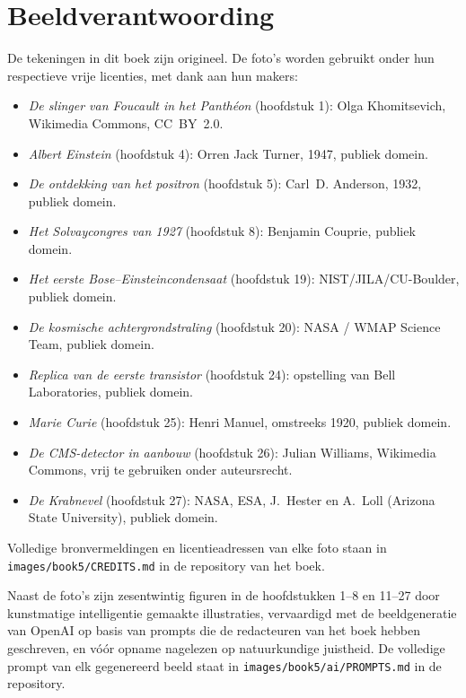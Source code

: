 \chapter*{Beeldverantwoording}

De tekeningen in dit boek zijn origineel. De foto's worden gebruikt
onder hun respectieve vrije licenties, met dank aan hun makers:

\begin{itemize}
  \item \emph{De slinger van Foucault in het Panthéon}
        (hoofdstuk 1): Olga Khomitsevich, Wikimedia Commons,
        CC~BY~2.0.
  \item \emph{Albert Einstein} (hoofdstuk 4): Orren Jack Turner,
        1947, publiek domein.
  \item \emph{De ontdekking van het positron} (hoofdstuk 5):
        Carl~D. Anderson, 1932, publiek domein.
  \item \emph{Het Solvaycongres van 1927} (hoofdstuk 8): Benjamin
        Couprie, publiek domein.
  \item \emph{Het eerste Bose--Einsteincondensaat} (hoofdstuk 19):
        NIST/JILA/CU-Boulder, publiek domein.
  \item \emph{De kosmische achtergrondstraling} (hoofdstuk 20):
        NASA / WMAP Science Team, publiek domein.
  \item \emph{Replica van de eerste transistor} (hoofdstuk 24):
        opstelling van Bell Laboratories, publiek domein.
  \item \emph{Marie Curie} (hoofdstuk 25): Henri Manuel, omstreeks
        1920, publiek domein.
  \item \emph{De CMS-detector in aanbouw} (hoofdstuk 26): Julian
        Williams, Wikimedia Commons, vrij te gebruiken onder
        auteursrecht.
  \item \emph{De Krabnevel} (hoofdstuk 27): NASA, ESA, J.~Hester en
        A.~Loll (Arizona State University), publiek domein.
\end{itemize}

Volledige bronvermeldingen en licentieadressen van elke foto staan in
\texttt{images/book5/CREDITS.md} in de repository van het boek.

\bigskip
Naast de foto's zijn zesentwintig figuren in de hoofdstukken 1--8 en
11--27 door kunstmatige intelligentie gemaakte illustraties,
vervaardigd met de beeldgeneratie van OpenAI op basis van prompts die
de redacteuren van het boek hebben geschreven, en vóór opname
nagelezen op natuurkundige juistheid. De volledige prompt van elk
gegenereerd beeld staat in \texttt{images/book5/ai/PROMPTS.md} in de
repository.
\clearpage
